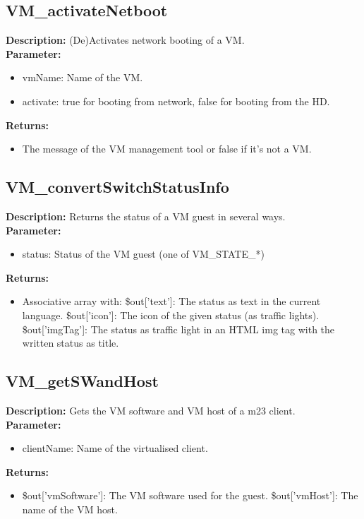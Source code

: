 \subsection{VM\_activateNetboot}
\textbf{Description:} (De)Activates network booting of a VM.\\
\textbf{Parameter:}
\begin{itemize}
\item vmName: Name of the VM.
\item activate: true for booting from network, false for booting from the HD.
\end{itemize}
\textbf{Returns:}
\begin{itemize}
\item The message of the VM management tool or false if it's not a VM.
\end{itemize}

\subsection{VM\_convertSwitchStatusInfo}
\textbf{Description:} Returns the status of a VM guest in several ways.\\
\textbf{Parameter:}
\begin{itemize}
\item status: Status of the VM guest (one of VM\_STATE\_*)
\end{itemize}
\textbf{Returns:}
\begin{itemize}
\item Associative array with: \$out['text']: The status as text in the current language. \$out['icon']: The icon of the given status (as traffic lights). \$out['imgTag']: The status as traffic light in an HTML img tag with the written status as title.
\end{itemize}

\subsection{VM\_getSWandHost}
\textbf{Description:} Gets the VM software and VM host of a m23 client.\\
\textbf{Parameter:}
\begin{itemize}
\item clientName: Name of the virtualised client.
\end{itemize}
\textbf{Returns:}
\begin{itemize}
\item \$out['vmSoftware']: The VM software used for the guest. \$out['vmHost']: The name of the VM host.
\end{itemize}

